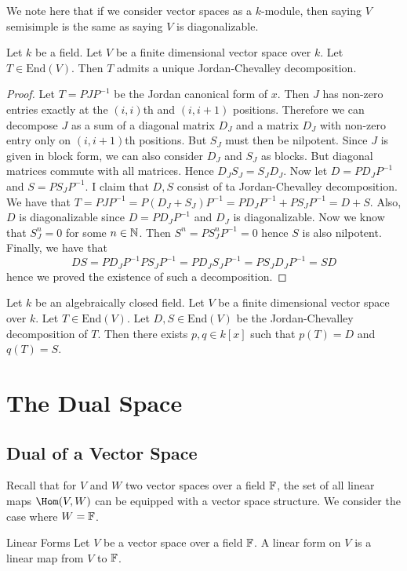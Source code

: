 \documentclass[a4paper]{article}
\begin{document}
We note here that if we consider vector spaces as a $k$-module, then saying $V$ semisimple is the same as saying $V$ is diagonalizable. 

\begin{prp}{}{} Let $k$ be a field. Let $V$ be a finite dimensional vector space over $k$. Let $T\in\text{End}(V)$. Then $T$ admits a unique Jordan-Chevalley decomposition. 
\begin{proof}
Let $T=PJP^{-1}$ be the Jordan canonical form of $x$. Then $J$ has non-zero entries exactly at the $(i,i)$th and $(i,i+1)$ positions. Therefore we can decompose $J$ as a sum of a diagonal matrix $D_J$ and a matrix $D_J$ with non-zero entry only on $(i,i+1)$th positions. But $S_J$ must then be nilpotent. Since $J$ is given in block form, we can also consider $D_J$ and $S_J$ as blocks. But diagonal matrices commute with all matrices. Hence $D_JS_J=S_JD_J$. Now let $D=PD_JP^{-1}$ and $S=PS_JP^{-1}$. I claim that $D,S$ consist of ta Jordan-Chevalley decomposition. We have that $T=PJP^{-1}=P(D_J+S_J)P^{-1}=PD_JP^{-1}+PS_JP^{-1}=D+S$. Also, $D$ is diagonalizable since $D=PD_JP^{-1}$ and $D_J$ is diagonalizable. Now we know that $S_J^n=0$ for some $n\in\mathbb{N}$. Then $S^n=PS_J^nP^{-1}=0$ hence $S$ is also nilpotent. Finally, we have that $$DS=PD_JP^{-1}PS_JP^{-1}=PD_JS_JP^{-1}=PS_JD_JP^{-1}=SD$$ hence we proved the existence of such a decomposition. 
\end{proof}
\end{prp}

\begin{prp}{}{} Let $k$ be an algebraically closed field. Let $V$ be a finite dimensional vector space over $k$. Let $T\in\text{End}(V)$. Let $D,S\in\text{End}(V)$ be the Jordan-Chevalley decomposition of $T$. Then there exists $p,q\in k[x]$ such that $p(T)=D$ and $q(T)=S$. 
\end{prp}

\pagebreak
\section{The Dual Space}
\subsection{Dual of a Vector Space}
Recall that for $V$ and $W$ two vector spaces over a field $\mathbb{F}$, the set of all linear maps $\Hom(V,W)$ can be equipped with a vector space structure. We consider the case where $W=\mathbb{F}$. 

\begin{defn}{Linear Forms}{} Let $V$ be a vector space over a field $\mathbb{F}$. A linear form on $V$ is a linear map from $V$ to $\mathbb{F}$. 
\end{defn}
\end{document}
